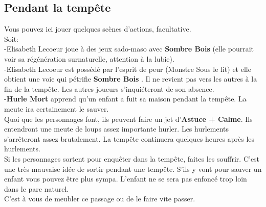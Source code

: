 \documentclass[oneside,12pt]{book}
\newcommand{\Peter}{\textbf{Hurle Mort} }
\newcommand{\Leonard}{\textbf{Sombre Bois} }
\begin{document}
\begin{flushleft}
\section{Pendant la tempête}
Vous pouvez ici jouer quelques scènes d'actions, facultative.\\
Soit:\\ 
-Elisabeth Lecoeur joue à des jeux sado-maso avec \Leonard (elle pourrait voir sa régénération surnaturelle, attention à la lubie).\\
-Elisabeth Lecoeur est possédé par l'esprit de peur (Monstre Sous le lit) et elle obtient une voie qui pétrifie \Leonard. Il ne revient pas vers les autres à la fin de la tempête. Les autres joueurs s'inquiéteront de son absence. \\
-\Peter apprend qu'un enfant a fuit sa maison pendant la tempête. La meute ira certainement le sauver. \\
Quoi que les personnages font, ils peuvent faire un jet d'\textbf{Astuce + Calme}. Ils entendront une meute de loups assez importante hurler. Les hurlements s'arrêteront assez brutalement. La tempête continuera quelques heures après les hurlements. \\
Si les personnages sortent pour enquêter dans la tempête, faites les souffrir. C'est une très mauvaise idée de sortir pendant une tempête. S'ils y vont pour sauver un enfant vous pouvez être plus sympa. L'enfant ne se sera pas enfoncé trop loin dans le parc naturel.\\
C'est à vous de meubler ce passage ou de le faire vite passer.


\end{flushleft}
\end{document}
